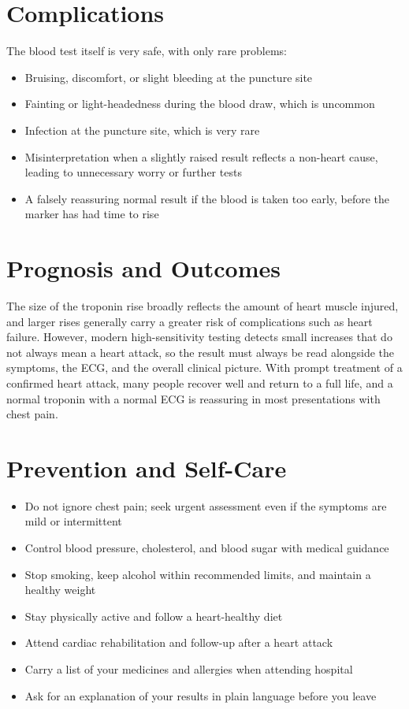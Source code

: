 \section*{Complications}
The blood test itself is very safe, with only rare problems:
\begin{itemize}
    \item Bruising, discomfort, or slight bleeding at the puncture site
    \item Fainting or light-headedness during the blood draw, which is uncommon
    \item Infection at the puncture site, which is very rare
    \item Misinterpretation when a slightly raised result reflects a non-heart cause, leading to unnecessary worry or further tests
    \item A falsely reassuring normal result if the blood is taken too early, before the marker has had time to rise
\end{itemize}

\section*{Prognosis and Outcomes}
The size of the troponin rise broadly reflects the amount of heart muscle injured, and larger rises generally carry a greater risk of complications such as heart failure. However, modern high-sensitivity testing detects small increases that do not always mean a heart attack, so the result must always be read alongside the symptoms, the ECG, and the overall clinical picture. With prompt treatment of a confirmed heart attack, many people recover well and return to a full life, and a normal troponin with a normal ECG is reassuring in most presentations with chest pain.

\section*{Prevention and Self-Care}
\begin{itemize}
    \item Do not ignore chest pain; seek urgent assessment even if the symptoms are mild or intermittent
    \item Control blood pressure, cholesterol, and blood sugar with medical guidance
    \item Stop smoking, keep alcohol within recommended limits, and maintain a healthy weight
    \item Stay physically active and follow a heart-healthy diet
    \item Attend cardiac rehabilitation and follow-up after a heart attack
    \item Carry a list of your medicines and allergies when attending hospital
    \item Ask for an explanation of your results in plain language before you leave
\end{itemize}

